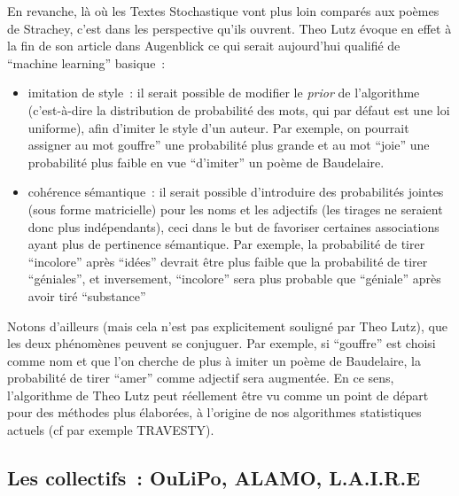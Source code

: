 \documentclass{article}
\begin{document}
				En revanche, là où les Textes Stochastique vont plus loin comparés aux poèmes de Strachey, c'est dans les perspective qu'ils ouvrent. Theo Lutz évoque en effet à la fin de son article dans Augenblick ce qui serait aujourd'hui qualifié de ``machine learning'' basique :
				\begin{itemize}
					\item imitation de style : il serait possible de modifier le \textit{prior} de l'algorithme (c'est-à-dire la distribution de probabilité des mots, qui par défaut est une loi uniforme), afin d'imiter le style d'un auteur. Par exemple, on pourrait assigner au mot gouffre'' une probabilité plus grande et au mot ``joie'' une probabilité plus faible en vue ``d'imiter'' un poème de Baudelaire.
					\item cohérence sémantique :  il serait possible d'introduire des probabilités jointes (sous forme matricielle) pour les noms et les adjectifs (les tirages ne seraient donc plus indépendants), ceci dans le but de favoriser certaines associations ayant plus de pertinence sémantique\footnotemark. Par exemple, la probabilité de tirer ``incolore'' après ``idées'' devrait être plus faible que la probabilité de tirer ``géniales'', et inversement, ``incolore'' sera plus probable que ``géniale'' après avoir tiré ``substance'' 
				\end{itemize}
				
				Notons d'ailleurs (mais cela n'est pas explicitement souligné par Theo Lutz), que les deux phénomènes peuvent se conjuguer. Par exemple, si ``gouffre'' est choisi comme nom et que l'on cherche de plus à imiter un poème de Baudelaire, la probabilité de tirer ``amer'' comme adjectif sera augmentée. En ce sens, l'algorithme de Theo Lutz peut réellement être vu comme un point de départ pour des méthodes plus élaborées, à l'origine de nos algorithmes statistiques actuels (cf par exemple TRAVESTY).
		\subsection{Les collectifs~: OuLiPo, ALAMO, L.A.I.R.E}
\end{document}
